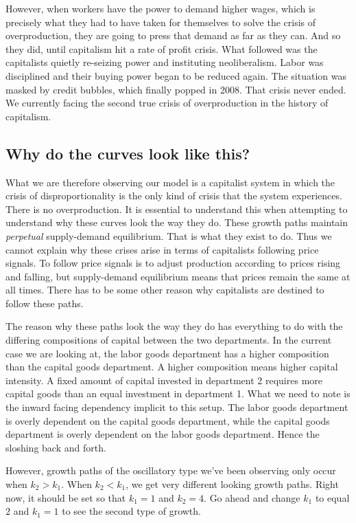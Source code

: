 \documentclass{article}
\theoremstyle{theorem}
\begin{document}
However, when workers have the power to demand higher wages, which is precisely what they had to have taken for themselves to solve the crisis of overproduction, they are going to press that demand as far as they can. And so they did, until capitalism hit a rate of profit crisis. What followed was the capitalists quietly re-seizing power and instituting neoliberalism. Labor was disciplined and their buying power began to be reduced again. The situation was masked by credit bubbles, which finally popped in 2008. That crisis never ended. We currently facing the second true crisis of overproduction in the history of capitalism. \par 
\subsection{Why do the curves look like this?}
What we are therefore observing our model is a capitalist system in which the crisis of disproportionality is the only kind of crisis that the system experiences. There is no overproduction. It is essential to understand this when attempting to understand why these curves look the way they do. These growth paths maintain \emph{perpetual} supply-demand equilibrium. That is what they exist to do. Thus we cannot explain why these crises arise in terms of capitalists following price signals. To follow price signals is to adjust production according to prices rising and falling, but supply-demand equilibrium means that prices remain the same at all times. There has to be some other reason why capitalists are destined to follow these paths. \par 
The reason why these paths look the way they do has everything to do with the differing compositions of capital between the two departments. In the current case we are looking at, the labor goods department has a higher composition than the capital goods department. A higher composition means higher capital intensity. A fixed amount of capital invested in department 2 requires more capital goods than an equal investment in department 1. What we need to note is the inward facing dependency implicit to this setup. The labor goods department is overly dependent on the capital goods department, while the capital goods department is overly dependent on the labor goods department. Hence the sloshing back and forth. \par 
However, growth paths of the oscillatory type we've been observing only occur when $k_2 > k_1$. When $k_2 < k_1$, we get very different looking growth paths. Right now, it should be set so that $k_1=1$ and $k_2=4$. Go ahead and change $k_1$ to equal $2$ and $k_1=1$ to see the second type of growth. 
\end{document}
